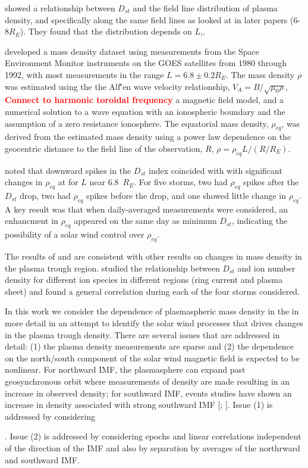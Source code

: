 \documentclass[10pt,twocolumn]{article}
\newcommand{\vinote}[1]{\textcolor{red}{\textbf{#1}}} %
\newcommand{\inote}[1]{\textcolor{blue}{\textbf{#1}}} %
\def\note#1\par{\textcolor{blue}{\textbf{#1}}\\}
\begin{document}
\cite{Denton2006} showed a relationship between $D_{st}$ and the field line distribution of plasma density, and specifically along the same field lines as looked at in later papers (6-8$R_E$). They found that the distribution depends on $L$,.

\cite{Takahashi2010} developed a mass density dataset using measurements from the Space Environment Monitor instruments on the GOES satellites from 1980 through 1992, with most measurements in the range $L=6.8\pm0.2 R_E$. The mass density $\rho$ was estimated using the the Alf\v'en wave velocity relationship, $V_A=B/\sqrt{\mu_0\rho}$, \vinote{Connect to harmonic toroidal frequency} a magnetic field model, and a numerical solution to a wave equation with an ionospheric boundary and the assumption of a zero resistance ionosphere.  The equatorial mass density, $\rho_{eq}$, was derived from the estimated mass density using a power law dependence on the geocentric distance to the field line of the observation, $R$, $\rho=\rho_{eq}L/(R/R_E)$. 

\cite{Takahashi2010} noted that downward spikes in the $D_{st}$ index coincided with with significant changes in $\rho_{eq}$ at for $L$ near 6.8~$R_E$. For five storms, two had $\rho_{eq}$ spikes after the $D_{st}$ drop, two had $\rho_{eq}$ spikes before the drop, and one showed little change in $\rho_{eq}$.  A key result was that when daily-averaged measurements were considered, an enhancment in $\rho_{eq}$ appeared on the same day as minimum $D_{st}$, indicating the possibility of a solar wind control over $\rho_{eq}$.

The results of \cite{Takahashi2006} and \cite{Takahashi2010} are consistent with other results on changes in mass density in the plasma trough region.  \cite{Yao2008} studied the relationship between $D_{st}$ and ion number density for different ion species in different regions (ring current and plasma sheet) and found a general correlation during each of the four storms considered.

In this work we consider the dependence of plasmaspheric mass density in the \cite{Takahashi2010} in more detail in an attempt to identify the solar wind processes that drives changes in the plasma trough density.  There are several issues that are addressed in detail: (1) the plasma density measurements are sparse and (2) the dependence on the north/south component of the solar wind magnetic field is expected to be nonlinear. For northward IMF, the plasmasphere can expand past geosynchronous orbit where measurements of density are made resulting in an increase in observed density; for southward IMF, events studies have shown an increase in density associated with strong southward IMF [\cite{Takahashi2010}; \cite{Yao2008}].  Issue (1) is addressed by considering \note{Finish}.  Issue (2) is addressed by considering epochs and linear correlations independent of the direction of the IMF and also by separation by averages of the northrward and southward IMF.
\end{document}
